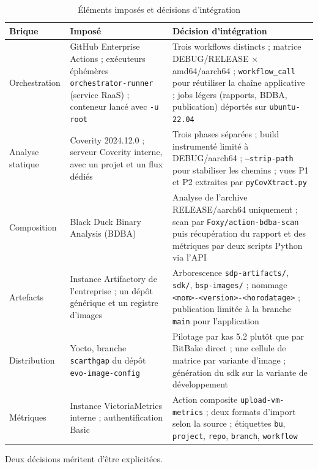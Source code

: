\begin{table}[H]
\centering
\caption{Éléments imposés et décisions d'intégration}
\label{tab:bes-decisions}
\small
\begin{tabularx}{\textwidth}{@{}p{2.3cm} X X@{}}
\toprule
\textbf{Brique} & \textbf{Imposé} & \textbf{Décision d'intégration} \\
\midrule
Orchestration & GitHub Enterprise Actions ; exécuteurs éphémères
  \texttt{orchestrator-runner} (service RaaS) ; conteneur lancé avec
  \texttt{-u root} &
  Trois workflows distincts ; matrice DEBUG/RELEASE $\times$ amd64/aarch64 ;
  \texttt{workflow\_call} pour réutiliser la chaîne applicative ; jobs légers
  (rapports, BDBA, publication) déportés sur \texttt{ubuntu-22.04} \\
\addlinespace
Analyse statique & Coverity 2024.12.0 ; serveur Coverity interne, avec un
  projet et un flux dédiés &
  Trois phases séparées ; build instrumenté limité à DEBUG/aarch64 ;
  \texttt{--strip-path} pour stabiliser les chemins ; vues P1 et P2
  extraites par \texttt{pyCovXtract.py} \\
\addlinespace
Composition & Black Duck Binary Analysis (BDBA) &
  Analyse de l'archive RELEASE/aarch64 uniquement ; scan par
  \texttt{Foxy/action-bdba-scan} puis récupération du rapport et des métriques
  par deux scripts Python via l'API \\
\addlinespace
Artefacts & Instance Artifactory de l'entreprise ; un dépôt générique et un
  registre d'images &
  Arborescence \texttt{sdp-artifacts/}, \texttt{sdk/}, \texttt{bsp-images/} ;
  nommage \texttt{<nom>-<version>-<horodatage>} ; publication limitée à la
  branche \texttt{main} pour l'application \\
\addlinespace
Distribution & Yocto, branche \texttt{scarthgap} du dépôt
  \texttt{evo-image-config} &
  Pilotage par kas 5.2 plutôt que par BitBake direct ; une cellule de matrice
  par variante d'image ; génération du \gls{sdk} sur la variante de
  développement \\
\addlinespace
Métriques & Instance VictoriaMetrics interne ;
  authentification Basic &
  Action composite \texttt{upload-vm-metrics} ; deux formats d'import selon la
  source ; étiquettes \texttt{bu}, \texttt{project}, \texttt{repo},
  \texttt{branch}, \texttt{workflow} \\
\bottomrule
\end{tabularx}
\end{table}

Deux décisions méritent d'être explicitées.

